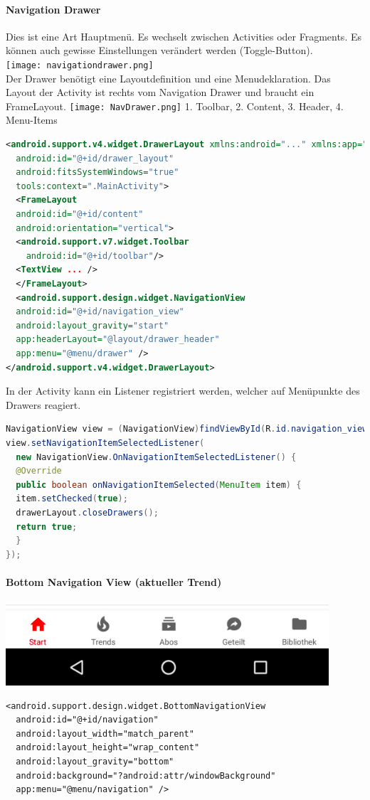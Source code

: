 \paragraph{Navigation Drawer} Dies ist eine Art Hauptmenü. Es wechselt zwischen Activities oder Fragments. Es können auch gewisse Einstellungen verändert werden (Toggle-Button). \\
\texttt{[image: navigationdrawer.png]} \\
Der Drawer benötigt eine Layoutdefinition und eine Menudeklaration. Das Layout der Activity ist rechts vom Navigation Drawer und braucht ein FrameLayout.
\texttt{[image: NavDrawer.png]}
1. Toolbar, 2. Content, 3. Header, 4. Menu-Items
\begin{lstlisting}[language=xml]
<android.support.v4.widget.DrawerLayout xmlns:android="..." xmlns:app="..." xmlns:tools="..."
  android:id="@+id/drawer_layout"
  android:fitsSystemWindows="true"
  tools:context=".MainActivity">
  <FrameLayout
  android:id="@+id/content"
  android:orientation="vertical">
  <android.support.v7.widget.Toolbar
    android:id="@+id/toolbar"/>
  <TextView ... />
  </FrameLayout>
  <android.support.design.widget.NavigationView
  android:id="@+id/navigation_view"
  android:layout_gravity="start"
  app:headerLayout="@layout/drawer_header"
  app:menu="@menu/drawer" />
</android.support.v4.widget.DrawerLayout>
\end{lstlisting}
In der Activity kann ein Listener registriert werden, welcher auf Menüpunkte des Drawers reagiert.
\begin{lstlisting}[language=java]
NavigationView view = (NavigationView)findViewById(R.id.navigation_view);
view.setNavigationItemSelectedListener(
  new NavigationView.OnNavigationItemSelectedListener() {
  @Override
  public boolean onNavigationItemSelected(MenuItem item) {
  item.setChecked(true);
  drawerLayout.closeDrawers();
  return true;
  }
});
\end{lstlisting}

\paragraph{Bottom Navigation View (aktueller Trend)}
\includegraphics[scale=0.4]{img/bottom_navigation_view.png}
\begin{lstlisting}
<android.support.design.widget.BottomNavigationView
  android:id="@+id/navigation"
  android:layout_width="match_parent"
  android:layout_height="wrap_content"
  android:layout_gravity="bottom"
  android:background="?android:attr/windowBackground"
  app:menu="@menu/navigation" /> 
\end{lstlisting}

